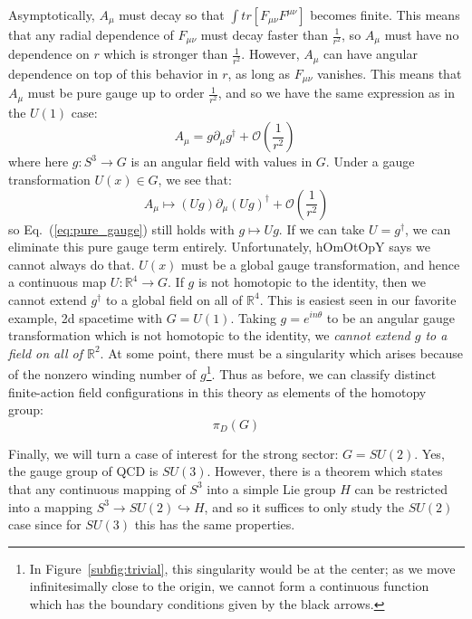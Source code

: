 \documentclass[11pt, oneside]{article}   	%
\theoremstyle{definition}
\begin{document}
Asymptotically, $A_\mu$ must decay so that $\int tr[F_{\mu\nu} F^{\mu\nu}]$ becomes finite. This means that any radial dependence of 
$F_{\mu\nu}$ must decay faster than $\frac{1}{r^2}$, so $A_\mu$ must have no dependence on $r$ which is stronger than $\frac{1}{r^2}$. 
However, $A_\mu$ can have angular dependence on top of this behavior in $r$, as long as $F_{\mu\nu}$ vanishes. This means that 
$A_\mu$ must be pure gauge up to order $\frac{1}{r^2}$, and so we have the same expression as in the $U(1)$ case:
\begin{equation}
	A_\mu = g \partial_\mu g^\dagger + \mathcal{O}\left(\frac{1}{r^2}\right)~
	\label{eq:pure_gauge}
\end{equation}
where here $g : S^3\rightarrow G$ is an angular field with values in $G$. Under a gauge transformation $U(x)\in G$, we see that:
\begin{equation}
	A_\mu\mapsto (Ug)\partial_\mu (Ug)^\dagger + \mathcal O\left(\frac{1}{r^2}\right)
\end{equation}
so Eq.~(\ref{eq:pure_gauge}) still holds with $g\mapsto Ug$. If we can take $U = g^\dagger$, we can eliminate this pure gauge term 
entirely. Unfortunately, hOmOtOpY says we cannot always do that. $U(x)$ must be a global gauge transformation, and hence a continuous 
map $U : \mathbb R^4\rightarrow G$. If $g$ is not homotopic to the identity, then we cannot extend $g^\dagger$ to a global field on all of $\mathbb R^4$. 
This is easiest seen in our favorite example, 2d spacetime with $G = U(1)$. Taking $g = e^{in\theta}$ to be an angular gauge transformation which is 
not homotopic to the identity, we \textit{cannot extend $g$ to a field on all of $\mathbb R^2$}. At some point, there must be a singularity 
which arises because of the nonzero winding number of $g$\footnote{In Figure~\ref{subfig:trivial}, this singularity would be at the center; as we move 
infinitesimally close to the origin, we cannot form a continuous function which has the boundary conditions given by the black arrows.}. 
Thus as before, we can classify distinct finite-action field configurations in this theory as elements of the homotopy group:
\begin{equation}
	\pi_D(G)
\end{equation}

Finally, we will turn a case of interest for the strong sector: $G = SU(2)$. Yes, the gauge group of QCD is $SU(3)$. However, there is a 
theorem which states that any continuous mapping of $S^3$ into a simple Lie group $H$ can be restricted into a mapping $S^3\rightarrow 
SU(2)\hookrightarrow H$, and so it suffices to only study the $SU(2)$ case since for $SU(3)$ this has the same properties.
\end{document}

